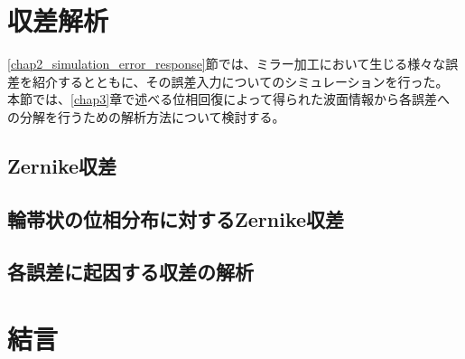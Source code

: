\section{収差解析}
\label{chap2_simulation_zernike_analysis}

\ref{chap2_simulation_error_response}節では、ミラー加工において生じる様々な誤差を紹介するとともに、その誤差入力についてのシミュレーションを行った。
本節では、\ref{chap3}章で述べる位相回復によって得られた波面情報から各誤差への分解を行うための解析方法について検討する。

\subsection{Zernike収差}

\subsection{輪帯状の位相分布に対するZernike収差}


\subsection{各誤差に起因する収差の解析}



\section{結言}
\label{chap2_conclusion}



